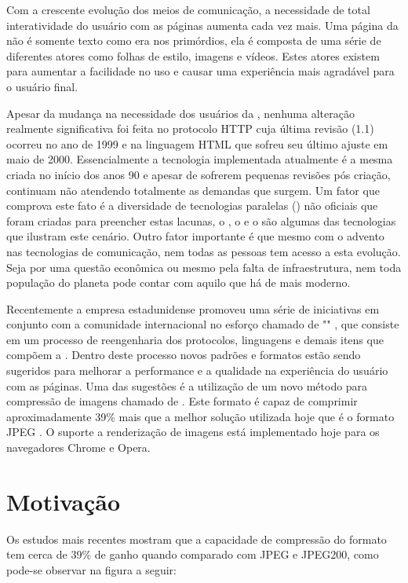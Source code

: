 \documentclass[espaco=simples,appendix=Name]{abnt}
\begin{document}
Com a crescente evolução dos meios de comunicação, a necessidade de total interatividade do usuário com as páginas aumenta cada vez mais. Uma página da  não é somente texto como era nos primórdios, ela é composta de uma série de diferentes atores como folhas de estilo, imagens e vídeos. Estes atores existem para aumentar a facilidade no uso e causar uma experiência mais agradável para o usuário final.

Apesar da mudança na necessidade dos usuários da , nenhuma alteração realmente significativa foi feita no protocolo HTTP cuja última revisão (1.1) ocorreu no ano de 1999 e na linguagem HTML que sofreu seu último ajuste em maio de 2000. Essencialmente a tecnologia implementada atualmente é a mesma criada no início dos anos 90 e apesar de sofrerem pequenas revisões pós criação, continuam não atendendo totalmente as demandas que surgem. Um fator que comprova este fato é a diversidade de tecnologias paralelas () não oficiais que foram criadas para preencher estas lacunas, o , o  e o  são algumas das tecnologias que ilustram este cenário. Outro fator importante é que mesmo com o advento nas tecnologias de comunicação, nem todas as pessoas tem acesso a esta evolução. Seja por uma questão econômica ou mesmo pela falta de infraestrutura, nem toda população do planeta pode contar com aquilo que há de mais moderno.

Recentemente a empresa estadunidense  promoveu uma série de iniciativas em conjunto com a comunidade internacional no esforço chamado de "" \cite{WebFaster}, que consiste em um processo de reengenharia dos protocolos, linguagens e demais itens que compõem a . Dentro deste processo novos padrões e formatos estão sendo sugeridos para melhorar a performance e a qualidade na experiência do usuário com as páginas. Uma das sugestões é a utilização de um novo método para compressão de imagens chamado de . Este formato é capaz de comprimir aproximadamente 39\% mais que a melhor solução utilizada hoje que é o formato JPEG \cite{WebPStudy}. O suporte a renderização de imagens  está implementado hoje para os navegadores Chrome e Opera.

\section{Motivação}

Os estudos mais recentes mostram que a capacidade de compressão do formato  tem cerca de 39\% de ganho quando comparado com JPEG e JPEG200, como pode-se observar na figura a seguir:
\end{document}
